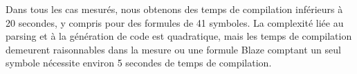 \documentclass[main]{subfiles}
\begin{document}
Dans tous les cas mesur\'es, nous obtenons des temps de compilation
inf\'erieurs \`a 20 secondes, y compris pour des formules de 41 symboles.
La complexit\'e  li\'ee au parsing et \`a la g\'en\'eration de code
est quadratique, mais les temps de compilation demeurent raisonnables
dans la mesure ou une formule Blaze comptant un seul symbole n\'ecessite
environ 5 secondes de temps de compilation.
\end{document}
